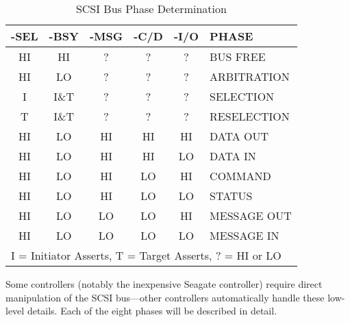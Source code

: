 \begin{table}[hbtp]
  \leavevmode
  \begin{center}
    \begin{tabular}{|c|c|c|c|c|l|} \hline
      -SEL & -BSY & -MSG & -C/D & -I/O & PHASE \\\hline\hline
      HI   & HI   & ?    & ?    & ?    & BUS FREE \\\hline
      HI   & LO   & ?    & ?    & ?    & ARBITRATION \\\hline
      I    & I\&T & ?    & ?    & ?    & SELECTION \\\hline
      T    & I\&T & ?    & ?    & ?    & RESELECTION \\\hline
      HI   & LO   & HI   & HI   & HI   & DATA OUT \\\hline
      HI   & LO   & HI   & HI   & LO   & DATA IN \\\hline
      HI   & LO   & HI   & LO   & HI   & COMMAND \\\hline
      HI   & LO   & HI   & LO   & LO   & STATUS \\\hline
      HI   & LO   & LO   & LO   & HI   & MESSAGE OUT \\\hline
      HI   & LO   & LO   & LO   & LO   & MESSAGE IN \\\hline
      \multicolumn{6}{l}{{\footnotesize I = Initiator Asserts, T = Target
          Asserts, ? = HI or LO}}
    \end{tabular}
    \caption{SCSI Bus Phase Determination}
    \label{tab:phase}
  \end{center}
\end{table}

Some controllers (notably the inexpensive Seagate controller) require
direct manipulation of the SCSI bus---other controllers automatically
handle these low-level details.  Each of the eight phases will be described
in detail.

